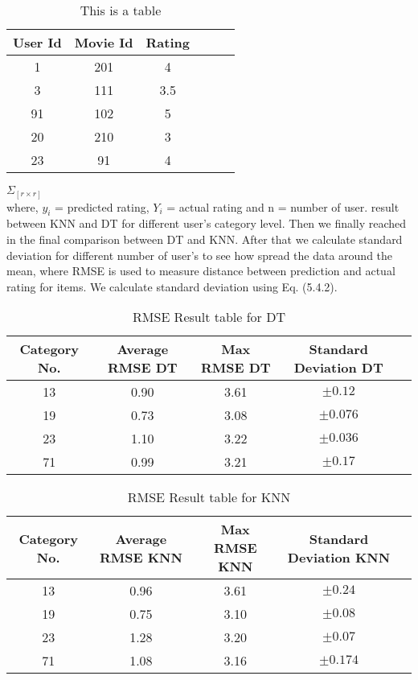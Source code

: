 \documentclass{article}
\begin{document}
\begin{table}[ht]
	\centering
	\caption{This is a table}
	\begin{tabular}{|c|c|c|c|c|c|}
		\hline 
		User Id & Movie Id & Rating \\
		\hline
		1 &	201 & 4\\
		3 &	111	& 3.5\\
		91 & 102 & 5\\
		20 & 210 & 3\\
		23 & 91 & 4\\
		
		\hline
	\end{tabular}
\end{table}
$\Sigma_{[r \times r]}$ \\
where, $y_i$ = predicted rating, $Y_i$ = actual rating and n = number of user.
result between KNN and DT for different user’s category level. Then we finally reached in the final comparison between DT and KNN. After that we calculate standard deviation for different number of user’s to see how spread the data around the mean, where RMSE is used to measure distance between prediction and actual rating for items. We calculate standard deviation using Eq. (5.4.2).
\begin{table}[ht]
	\begin{center}
		\begin{tabular}{ |c|c|c|c|c| } 
			\hline 
			Category No. & Average RMSE DT & Max RMSE DT & Standard Deviation DT \\
			\hline
			13  & 0.90	& 3.61	& $\pm0.12$\\
			19	& 0.73	& 3.08	& $\pm0.076$\\
			23	& 1.10	& 3.22	& $\pm0.036$\\
			71	& 0.99	& 3.21	& $\pm0.17$\\
			
			\hline
		\end{tabular}
		\caption{RMSE Result table for DT}
		\label{tableResdt}
	\end{center}
	
\end{table}

\begin{table}[ht]
	\begin{center}
		\begin{tabular}{ |c|c|c|c|c| } 
			\hline 
			Category No. & Average RMSE KNN & Max RMSE KNN & Standard Deviation KNN \\
			\hline
			13	& 0.96	& 3.61	& $\pm0.24$\\
			19	& 0.75	& 3.10	& $\pm0.08$\\
			23	& 1.28	& 3.20	& $\pm0.07$\\
			71	& 1.08	& 3.16	& $\pm0.174$\\
			
			\hline
		\end{tabular}
		\caption{RMSE Result table for KNN}
	\end{center}
	
\end{table}
\end{document}
